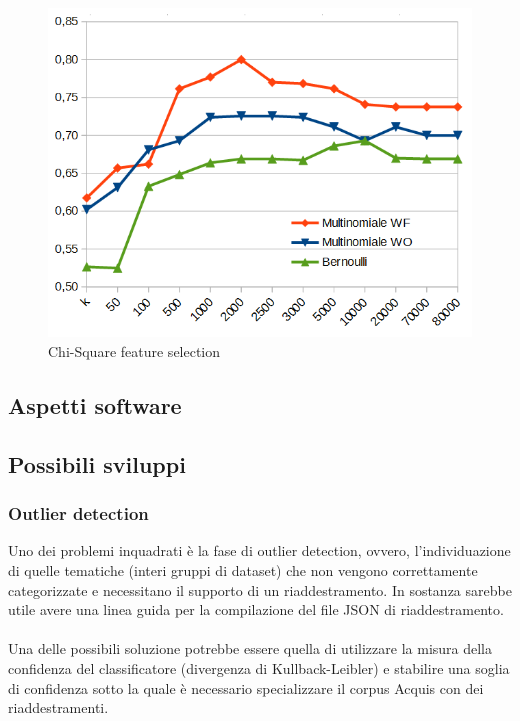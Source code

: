 \documentclass{article}
\theoremstyle{plain}
\theoremstyle{definition}
\begin{document}
\begin{figure}[htbp]
\begin{center}
\includegraphics[scale=0.55]{img/gr3.png}
\caption{Chi-Square feature selection}
\end{center}
\end{figure}
\newpage


\subsection{Aspetti software}
\newpage

\subsection{Possibili sviluppi}
\subsubsection{Outlier detection}
Uno dei problemi inquadrati è la fase di outlier detection, ovvero, l'individuazione di quelle tematiche (interi gruppi di dataset) che non vengono correttamente categorizzate e necessitano il supporto di un riaddestramento. In sostanza sarebbe utile avere una linea guida per la compilazione del file JSON di riaddestramento.
\\
\\
Una delle possibili soluzione potrebbe essere quella di utilizzare la misura della confidenza del classificatore (divergenza di Kullback-Leibler) e stabilire una soglia di confidenza sotto la quale è necessario specializzare il corpus Acquis con dei riaddestramenti.
\end{document}
